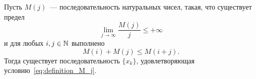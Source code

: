 \begin{hypothesis}
	Пусть $M(j)$~--- последовательность натуральных чисел, такая, что существует предел
	\begin{equation}
		\lim_{j\to\infty} \frac{M(j)}{j} \leq +\infty
	\end{equation}
	и для любых $i,j\in\mathbb{N}$ выполнено
	\begin{equation}
		M(i)+M(j) \leq M(i+j)
		.
	\end{equation}
	Тогда существует последовательность $\{x_k\}$,
	удовлетворяющая условию~\eqref{eq:definition_M_j}.
\end{hypothesis}
